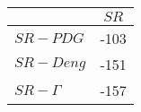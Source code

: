 \begin{tabular}{l|c}
\toprule
{} &  $SR$ \\
\midrule
\textbf{$SR-PDG$   } &  -103 \\
\textbf{$SR-Deng$  } &  -151 \\
\textbf{$SR-\Gamma$} &  -157 \\
\bottomrule
\end{tabular}
